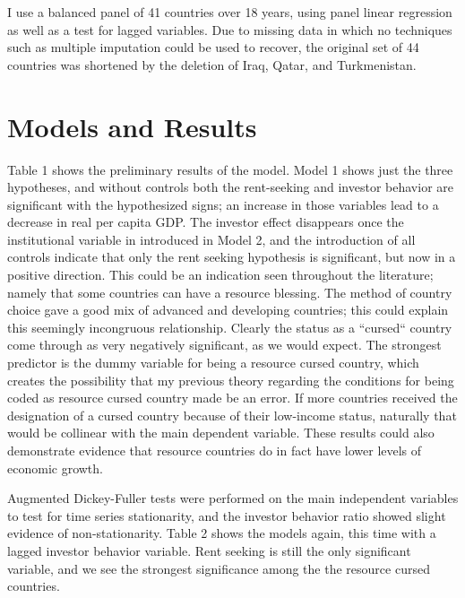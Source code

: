 \documentclass[12pt]{report}   	%
\begin{document}
I use a balanced panel of 41 countries over 18 years, using panel linear regression as well as a test for lagged variables. Due to missing data in which no techniques such as multiple imputation could be used to recover, the original set of 44 countries was shortened by the deletion of Iraq, Qatar, and Turkmenistan.

\section*{Models and Results}
Table 1 shows the preliminary results of the model. Model 1 shows just the three hypotheses, and without controls both the rent-seeking and investor behavior are significant with the hypothesized signs; an increase in those variables lead to a decrease in real per capita GDP. The investor effect disappears once the institutional variable in introduced in Model 2, and the introduction of all controls indicate that only the rent seeking hypothesis is significant, but now in a positive direction. This could be an indication seen throughout the literature; namely that some countries can have a resource blessing. The method of country choice gave a good mix of advanced and developing countries; this could explain this seemingly incongruous relationship. Clearly the status as a ``cursed`` country come through as very negatively significant, as we would expect. The strongest predictor is the dummy variable for being a resource cursed country, which creates the possibility that my previous theory regarding the conditions for being coded as resource cursed country made be an error. If more countries received the designation of a cursed country because of their low-income status, naturally that would be collinear with the main dependent variable. These results could also demonstrate evidence that resource countries do in fact have lower levels of economic growth. 

Augmented Dickey-Fuller tests were performed on the main independent variables to test for time series stationarity, and the investor behavior ratio showed slight evidence of non-stationarity. Table 2 shows the models again, this time with a lagged investor behavior variable. Rent seeking is still the only significant variable, and we see the strongest significance among the the resource cursed countries. 
\end{document}
